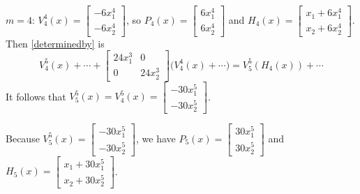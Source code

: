 \documentclass{article}
\begin{document}
$m=4$: $V_4^4(x)=\begin{bmatrix}-6x_1^4\\-6x_2^4\end{bmatrix}$, so $P_4(x)=
\begin{bmatrix}6x_1^4\\6x_2^4\end{bmatrix}$ and $H_4(x)=
\begin{bmatrix}x_1+6x_1^4\\x_2+6x_2^4\end{bmatrix}$.
Then \eqref{determinedby} is
\[
V_4^5(x)+\cdots+\begin{bmatrix}24x_1^3&0\\0&24x_2^3\end{bmatrix}\bigg(V_4^4(x)+\cdots\bigg)
=V_5^5(H_4(x))+\cdots
\]
It follows that $V_5^5(x)=V_4^5(x)=\begin{bmatrix}-30x_1^5\\-30x_2^5\end{bmatrix}$.

Because 
$V_5^5(x)=\begin{bmatrix}-30x_1^5\\-30x_2^5\end{bmatrix}$, we have
$P_5(x)=\begin{bmatrix}30x_1^5\\30x_2^5\end{bmatrix}$
and $H_5(x)=\begin{bmatrix}x_1+30x_1^5\\x_2+30x_2^5\end{bmatrix}$.
\end{document}
